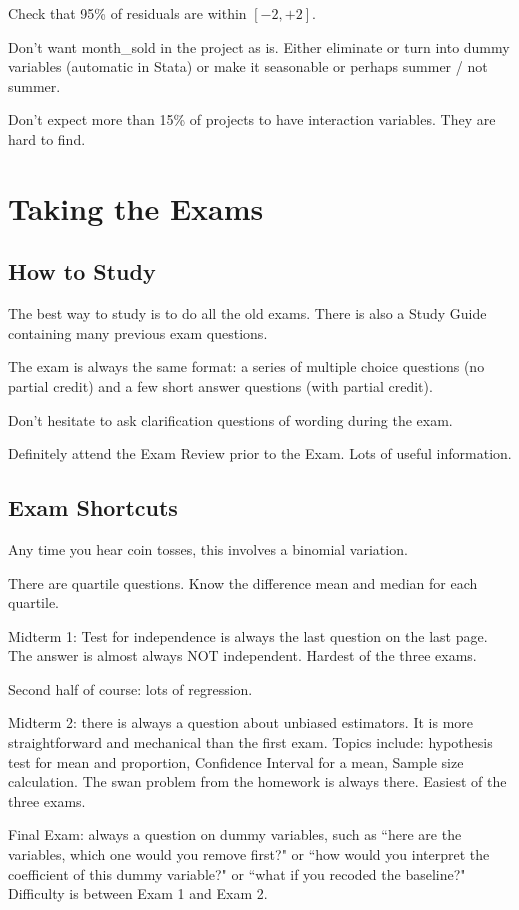 \documentclass[11pt, oneside]{article}   	%
\begin{document}
Check that 95\% of residuals are within $[-2, +2]$.

Don't want month\_sold in the project as is. Either eliminate or turn into dummy variables  (automatic in Stata) or make it seasonable or perhaps summer / not summer.  

Don't expect more than 15\% of projects to have interaction variables. They are hard to find.


\section{Taking the Exams}
\subsection{How to Study}
The best way to study is to do all the old exams. There is also a Study Guide containing many previous exam questions.

The exam is always the same format: a series of multiple choice questions (no partial credit) and a few short answer questions (with partial credit).

Don't hesitate to ask clarification questions of wording during the exam.

Definitely attend the Exam Review prior to the Exam. Lots of useful information.

\subsection{Exam Shortcuts}

Any time you hear coin tosses, this involves a binomial variation.

There are quartile questions. Know the difference mean and median for each quartile. 

Midterm 1: Test for independence is always the last question on the last page. The answer is almost always NOT independent. Hardest of the three exams.

Second half of course: lots of regression.

Midterm 2: there is always a question about unbiased estimators. It is more straightforward and mechanical than the first exam. Topics include: hypothesis test for mean and proportion, Confidence Interval for a mean, Sample size calculation. The swan problem from the homework is always there. Easiest of the three exams.

Final Exam: always a question on dummy variables, such as ``here are the variables, which one would you remove first?" or ``how would you interpret the coefficient of this dummy variable?" or ``what if you recoded the baseline?" Difficulty is between Exam 1 and Exam 2.
\end{document}
